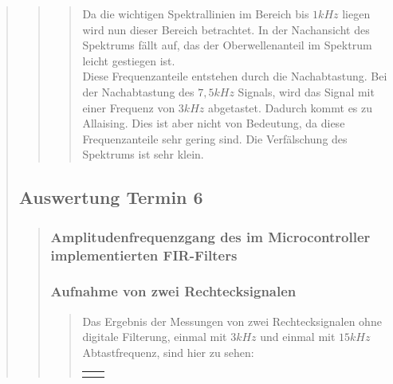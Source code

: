 \begin{quote}
\begin{quote}
\begin{quote}
            Da die wichtigen Spektrallinien im Bereich bis $1kHz$ liegen wird nun dieser Bereich betrachtet. In der
            Nachansicht des Spektrums fällt auf, das der Oberwellenanteil im Spektrum leicht gestiegen ist.\\
            Diese Frequenzanteile entstehen durch die Nachabtastung. Bei der Nachabtastung des $7,5kHz$ Signals, wird
            das Signal mit einer Frequenz von $3kHz$ abgetastet. Dadurch kommt es zu Allaising. Dies ist aber nicht von
            Bedeutung, da diese Frequenzanteile sehr gering sind. Die Verfälschung des Spektrums ist sehr klein.
			
		\end{quote} %
    \end{quote}  %
    
    \subsection{Auswertung Termin 6}
    \begin{quote}
    
        \subsubsection{Amplitudenfrequenzgang des im Microcontroller
        implementierten FIR-Filters}
    	\begin{quote}
    	\end{quote}
    	
    	
    	\subsubsection{Aufnahme von zwei Rechtecksignalen}
    	\begin{quote}
    	
    	Das Ergebnis der Messungen von zwei Rechtecksignalen ohne digitale
    	Filterung, einmal mit $3kHz$ und einmal mit $15kHz$ Abtastfrequenz, sind
    	hier zu sehen:
    	
    	 \begin{center}
                \begin{tabular}{ll}
    
                \hspace{-12em}
                    \begin{minipage}{0.6\textwidth}
    

\end{minipage}
\end{tabular}
\end{center}
\end{quote}
\end{quote}
\end{quote}
